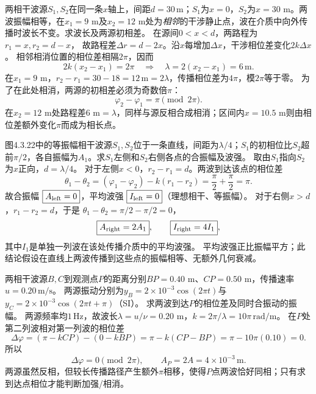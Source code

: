 \problemtext 两相干波源$S_1,S_2$在同一条$x$轴上，间距$d=30\,\mathrm m$；$S_1$为$x=0$，$S_2$为$x=30$ m。两波振幅相等，在$x_1=9$ m及$x_2=12$ m处为\emph{相邻}的干涉静止点，波在介质中向外传播时波长不变。求波长及两源初相差。
\workings
在源间$0<x<d$，两路程为$r_1=x,r_2=d-x$，
故路程差$\Delta r=d-2x$。沿$x$每增加$\Delta x$，干涉相位差变化$2k\Delta x$。
相邻相消位置的相位差相隔$2\pi$，因而
\[
2k(x_2-x_1)=2\pi
\quad\Longrightarrow\quad
\boxed{\lambda=2(x_2-x_1)=6\,\mathrm m}.
\]
在$x_1=9$ m，$r_2-r_1=30-18=12\,\mathrm m=2\lambda$，传播相位差为$4\pi$，模$2\pi$等于零。
为了在此处相消，两源的初相差必须为奇数倍$\pi$：
\[
\boxed{\varphi_2-\varphi_1=\pi\pmod{2\pi}}.
\]
\crosscheck 在$x_2=12$ m处路程差$6$ m$=\lambda$，同样与源反相合成相消；区间内$x=10.5$ m则由相位差额外变化$\pi$而成为相长点。

\problemtext 图4.3.22中的等振幅相干波源$S_1,S_2$位于一条直线，间距为$\lambda/4$；$S_1$的初相位比$S_2$超前$\pi/2$，各自振幅为$A_1$。求$S_1$左侧和$S_2$右侧各点的合振幅及波强。
\workings
取由$S_1$指向$S_2$为$x$正向，$d=\lambda/4$。
对于左侧$x<0$，$r_2-r_1=d$。两波到达该点的相位差
\[
\theta_1-\theta_2
=(\varphi_1-\varphi_2)-k(r_1-r_2)
=\frac\pi2+\frac\pi2=\pi.
\]
故合振幅
$\boxed{A_{\rm left}=0}$，平均波强
$\boxed{I_{\rm left}=0}$（理想相干、等振幅）。
对于右侧$x>d$，$r_1-r_2=d$，于是
$\theta_1-\theta_2=\pi/2-\pi/2=0$，
\[
\boxed{A_{\rm right}=2A_1},\qquad
\boxed{I_{\rm right}=4I_1},
\]
其中$I_1$是单独一列波在该处传播介质中的平均波强。
\crosscheck 平均波强正比振幅平方；此结论假设在直线上两波传播到这些点的振幅相等、无额外几何衰减。

\problemtext 两相干波源$B,C$到观测点$P$的距离分别$BP=0.40$ m、$CP=0.50$ m，传播速率$u=0.20\,\mathrm{m/s}$。
两源振动分别为$y_B=2\times10^{-3}\cos(2\pi t)$与
$y_C=2\times10^{-3}\cos(2\pi t+\pi)$（SI）。
求两波到达$P$的相位差及同时合振动的振幅。
\workings
两源频率均$1\,\mathrm{Hz}$，故波长$\lambda=u/\nu=0.20$ m，$k=2\pi/\lambda=10\pi\,\mathrm{rad/m}$。
在$P$处第二列波相对第一列波的相位差
\[
\Delta\varphi=(\pi-k CP)-(0-k BP)
=\pi-k(CP-BP)
=\pi-10\pi(0.10)=0.
\]
所以
\[
\boxed{\Delta\varphi=0\pmod{2\pi}},\qquad
\boxed{A_P=2A=4\times10^{-3}\,\mathrm m}.
\]
\crosscheck 两源虽然反相，但较长传播路径产生额外$\pi$相移，使得$P$点两波恰好同相；只有求到达点相位才能判断加强/相消。
